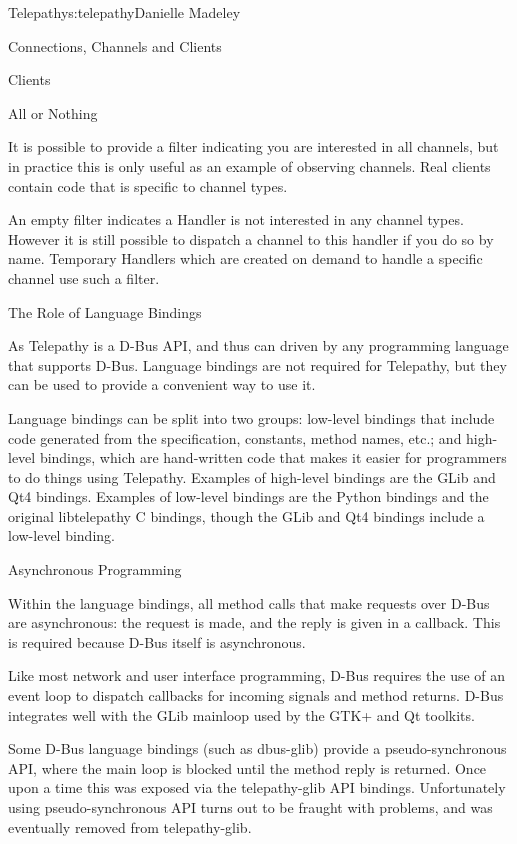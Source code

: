 \begin{aosachapter}{Telepathy}{s:telepathy}{Danielle Madeley}
\begin{aosasect1}{Connections, Channels and Clients}
\begin{aosasect2}{Clients}
\begin{aosabox}{All or Nothing}

It is possible to provide a filter indicating you are interested in
all channels, but in practice this is only useful as an example of
observing channels. Real clients contain code that is specific to
channel types.

An empty filter indicates a Handler is not interested in any channel
types. However it is still possible to dispatch a channel to this
handler if you do so by name.  Temporary Handlers which are created on
demand to handle a specific channel use such a filter.

\end{aosabox}

\end{aosasect2}

\end{aosasect1}

\begin{aosasect1}{The Role of Language Bindings}

As Telepathy is a D-Bus API, and thus can driven by any programming
language that supports D-Bus.  Language bindings are not required for
Telepathy, but they can be used to provide a convenient way to use it.

Language bindings can be split into two groups: low-level bindings
that include code generated from the specification, constants, method
names, etc.; and high-level bindings, which are hand-written code that
makes it easier for programmers to do things using Telepathy.
Examples of high-level bindings are the GLib and Qt4 bindings.
Examples of low-level bindings are the Python bindings and the
original libtelepathy C bindings, though the GLib and Qt4 bindings
include a low-level binding.

\begin{aosasect2}{Asynchronous Programming}

Within the language bindings, all method calls that make requests over
D-Bus are asynchronous: the request is made, and the reply is given in
a callback. This is required because D-Bus itself is asynchronous.

Like most network and user interface programming, D-Bus requires the
use of an event loop to dispatch callbacks for incoming signals and
method returns. D-Bus integrates well with the GLib mainloop used by
the GTK+ and Qt toolkits.

Some D-Bus language bindings (such as dbus-glib) provide a
pseudo-synchronous API, where the main loop is blocked until the
method reply is returned.  Once upon a time this was exposed via the
telepathy-glib API bindings. Unfortunately using pseudo-synchronous
API turns out to be fraught with problems, and was eventually removed
from telepathy-glib.


\end{aosasect2}
\end{aosasect1}
\end{aosachapter}
